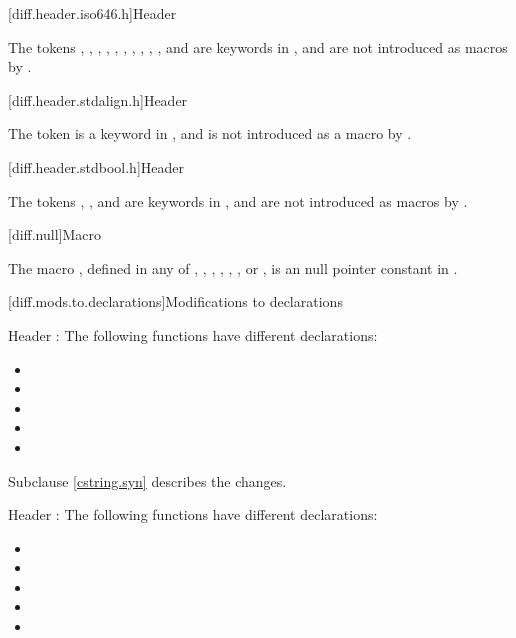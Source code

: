 [diff.header.iso646.h]{Header }

\pnum
The tokens
,
,
,
,
,
,
,
,
,
,
and
are keywords in \Cpp{},
and are not introduced as macros
by .

[diff.header.stdalign.h]{Header }
%

\pnum
The token  is a keyword in \Cpp{},
and is not introduced as a macro
by .

[diff.header.stdbool.h]{Header }
%

\pnum
The tokens , , and 
are keywords in \Cpp{},
and are not introduced as macros
by .

[diff.null]{Macro }

\pnum
The macro
,
defined in any of
,
,
,
,
,
,
or ,
is an  null pointer constant in
\Cpp{}.

[diff.mods.to.declarations]{Modifications to declarations}

\pnum
Header :
The following functions have different declarations:
\begin{itemize}
\item {}
\item {}
\item {}
\item {}
\item {}
\end{itemize}

Subclause \ref{cstring.syn} describes the changes.

\pnum
Header :
The following functions have different declarations:
\begin{itemize}
\item {}
\item {}
\item {}
\item {}
\item {}
\end{itemize}

